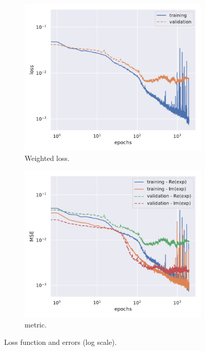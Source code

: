 \begin{figure}[htbp]
  \centering
  \begin{subfigure}{0.45\textwidth}
    \centering
    \includegraphics[width=\linewidth]{img/loss}
    \caption{Weighted loss.}
  \end{subfigure}
  \begin{subfigure}{0.45\textwidth}
    \centering
    \includegraphics[width=\linewidth]{img/mse}
    \caption{\mse metric.}
  \end{subfigure}
  \caption{Loss function and errors (log scale).}
  \label{fig:agg:err}
\end{figure}

